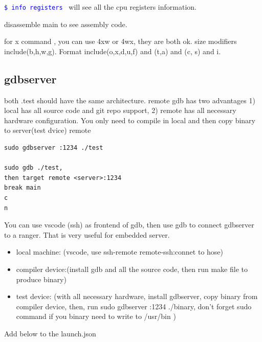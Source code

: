 \documentclass[paper=8.5in:11in, twoside, 12pt, pagesize=pdftex]{book}
\newcommand{\linuxcommand}[1]{\texttt{\textcolor{blue}{\$ #1 \Pisymbol{psy}{191}}}}
\begin{document}
\linuxcommand{info registers} will see all the cpu registers information.

disassemble main to see assembly code. 

for x command , you can use 4xw or 4wx, they are both ok. size modifiers include(b,h,w,g). Format include(o,x,d,u,f) and (t,a) and (c, s) and i.  

\subsection{gdbserver}

both .test should have the same architecture. remote gdb has two advantages 1) local has all source code and git repo support,  2) remote has all necessary hardware configuration. You only need to compile in local and then copy binary to server(test dvice) remote
\begin{lstlisting}
sudo gdbserver :1234 ./test

sudo gdb ./test, 
then target remote <server>:1234
break main
c
n
\end{lstlisting}



You can use vscode (ssh) as frontend of gdb, then use gdb to connect gdbserver to a ranger. That is very useful for embedded server. 

\begin{itemize}
\item local machine: (vscode, use ssh-remote remote-ssh:connet to hose)

\item compiler device:(install gdb and all the source code, then run make file to produce binary)

\item test device: (with all necessary hardware, install gdbserver, copy binary from compiler device, then, run sudo gdbserver :1234 ./binary, don't forget sudo command if you binary need to write to /usr/bin ) 
 
\end{itemize}


Add below to the launch.json
\end{document}

